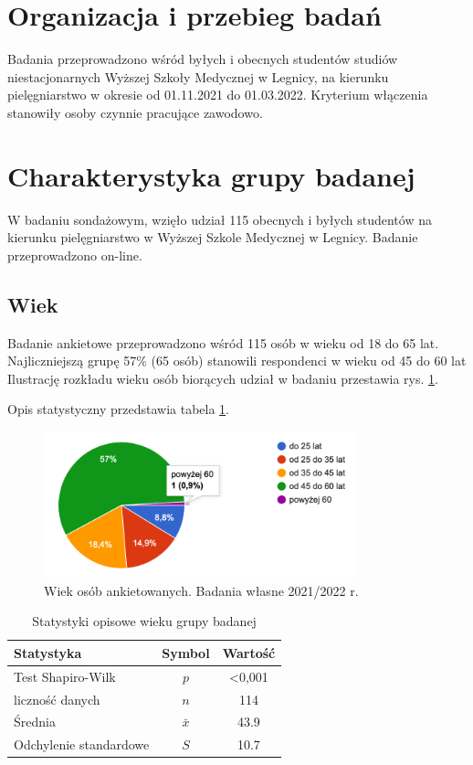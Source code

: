 \documentclass[a4paper,12pt,twoside,openright]{mwrep}
\begin{document}
\section{Organizacja i przebieg badań}
Badania przeprowadzono wśród byłych i obecnych studentów studiów niestacjonarnych Wyższej Szkoły Medycznej w Legnicy, na kierunku pielęgniarstwo w okresie od 01.11.2021 do 01.03.2022. Kryterium włączenia stanowiły osoby czynnie pracujące zawodowo. 


\section{Charakterystyka grupy badanej}


W badaniu sondażowym, wzięło udział 115 obecnych i byłych studentów na kierunku pielęgniarstwo w Wyższej Szkole Medycznej w Legnicy. Badanie przeprowadzono on-line.


\subsection*{Wiek}

Badanie ankietowe przeprowadzono wśród 115 osób w wieku od 18 do 65 lat. Najliczniejszą grupę 57\%  (65 osób) stanowili respondenci w wieku od 45 do 60 lat 
Ilustrację rozkładu wieku osób biorących udział w badaniu przestawia rys. \ref{rys:wiek}.

Opis statystyczny przedstawia tabela \ref{tab:wiek}.



\begin{figure}[H]
\centering
\includegraphics[width=9cm]{char_gr_bad/wiek00}
\caption{Wiek osób ankietowanych. Badania własne 2021/2022 r.}
\label{rys:wiek}
\end{figure}


\begin {table}[H]
\caption{Statystyki opisowe wieku grupy badanej}
\centering
\begin{tabular}{|l|c|c|}
\hline
Statystyka & Symbol & Wartość\\
\hline
Test Shapiro-Wilk & $p$ & <0,001\\
\hline
liczność danych & $n$ & 114\\
\hline
Średnia & $\bar{x}$ & 43.9\\
\hline
Odchylenie standardowe & $S$ & 10.7\\
\hline

\end{tabular}
\label{tab:wiek}
\end{table}
\end{document}
